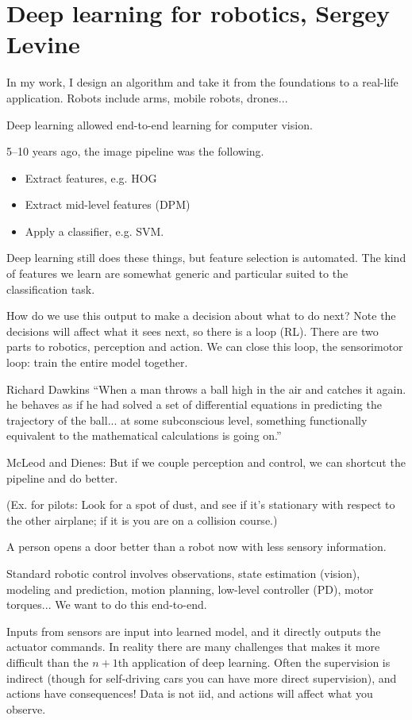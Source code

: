 \section{Deep learning for robotics, Sergey Levine}

In my work, I design an algorithm and take it from the  foundations to a real-life application. Robots include arms, mobile robots, drones...

Deep learning allowed end-to-end learning for computer vision.

5--10 years ago, the image pipeline was the following.
\begin{itemize}
\item
Extract features, e.g. HOG
\item
Extract mid-level features (DPM)
\item
Apply a classifier, e.g. SVM.
\end{itemize}
Deep learning still does these things, but feature selection is automated. The kind of features we learn are somewhat generic and particular suited to the classification task.

How do we use this output to make a decision about what to do next? Note the decisions will affect what it sees next, so there is a loop (RL). 
There are two parts to robotics, perception and action. We can close this loop, the sensorimotor loop: train the entire model together.


Richard Dawkins ``When a man throws a ball high in the air and catches it again. he behaves as if he had solved a set of differential equations in predicting the trajectory of the ball... at some subconscious level, something functionally equivalent to the mathematical calculations is going on.''

McLeod and Dienes: But if we couple perception and control, we can shortcut the pipeline and do better.

(Ex. for pilots: Look for a spot of dust, and see if it's stationary with respect to the other airplane; if it is you are on a collision course.)

A person opens a door better than a robot now with less sensory information.

Standard robotic control involves observations, state estimation (vision), modeling and prediction, motion planning, low-level controller (PD), motor torques... We want to do this end-to-end.

Inputs from sensors are input into learned model, and it directly outputs the actuator commands. In reality there are many challenges that makes it more difficult than the $n+1$th application of deep learning. Often the supervision is indirect (though for self-driving cars you can have more direct supervision), and actions have consequences! Data is not iid, and actions will affect what you observe.

